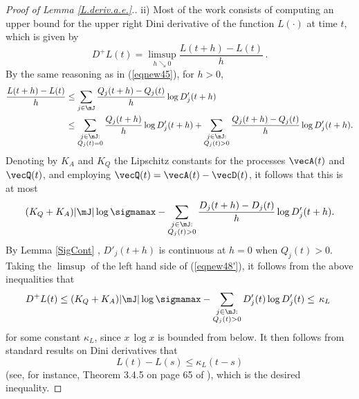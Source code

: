 \documentclass{amsart}
\begin{document}
\begin{proof}[Proof of Lemma \ref{L.deriv.a.e.}.]
ii) Most of the work consists of computing an upper bound for the upper right Dini derivative of the function $L(\cdot)$  at time $t$, which is given by
\begin{equation}\label{eq:L.upper.Dini.deriv}
D^+L(t) = \limsup_{h\searrow 0} \frac{ L(t+h) - L(t)}{h} \, .
\end{equation}
By the same reasoning as in (\ref{eqnew45}), for
$h>0$,
\begin{equation}
\label{eqnew48'}
\begin{split}
\frac{L(t+h) - L(t)}{h} 
&\leq  \sum_{j\in\mJ} \frac{Q_j(t+h)-Q_j(t)}{h} \log D'_j(t+h) \\
& \leq  
\sum_{\substack{j\in\mJ:\\ Q_j(t) =0}} \frac{Q_j(t+h)}{h} \log D'_j(t+h)  
 + \sum_{\substack{j\in\mJ:\\ Q_j(t) >0}}  \frac{Q_j(t+h)-Q_j(t)}{h} \log D'_j(t+h).
\end{split}
\end{equation}
Denoting by $K_A$ and $K_Q$ the Lipschitz constants for the processes $\vecA(t)$ and $\vecQ(t)$, and employing $\vecQ(t) = \vecA(t)-\vecD(t)$, it follows that this is at most
\begin{equation*} 
(K_Q +K_A) |\mJ| \log \sigmamax
- \sum_{\substack{j\in\mJ:\\ Q_j(t) >0}}  \frac{D_j(t+h)-D_j(t)}{h} \log D'_j(t+h). 
\end{equation*}
By Lemma \ref{SigCont} , $D'_j(t+h)$ is continuous at $h=0$ when $Q_j(t)>0$.  Taking the $\limsup$ of the left hand side of (\ref{eqnew48'}), it follows from the above inequalities that
\begin{align}\label{eq:upper.right.derivative}
D^+L(t) \leq  
(K_Q +K_A) |\mJ| \log \sigmamax  - \sum_{\substack{j\in\mJ:\\ Q_j(t) >0}}  D'_j(t) \log D'_j(t) \leq \,  \kappa_L \ 
\end{align}
for some constant $\kappa_L$, since  $x\,\log x$ is bounded from below. It then follows from standard results on Dini derivatives that
\begin{equation}\label{LDev}
L(t)-L(s) \leq \kappa_L (t-s)
\end{equation}
(see, for instance, Theorem 3.4.5 on page 65 of \cite{kannan1996advanced}), which is the desired inequality.


\end{proof}
\end{document}
